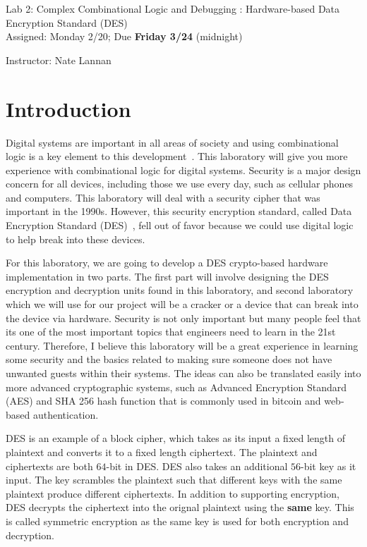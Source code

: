 \documentclass{article}
\newcommand{\myassignment}{Lab 2: Complex Combinational Logic and Debugging : Hardware-based Data Encryption Standard (DES)}
\newcommand{\myduedate}{Assigned: Monday 2/20; Due \textbf{Friday 3/24} (midnight)}
\newcommand{\myinstructor}{Instructor: Nate Lannan}
\begin{document}
\begin{center}
  {\huge \myassignment} \\
  {\large \myduedate} \\
  \begin{flushright}
  \myinstructor \\
  \end{flushright}
\end{center}

\section{Introduction}

Digital systems are important in all areas of society and using
combinational logic is a key element to this
development~\cite{ddca-riscv}.  This
laboratory will give you more experience with combinational logic
for digital systems.  
Security is a major design concern for all devices, including those  we
use every day, such as cellular phones and computers.
This laboratory will deal with a security cipher that was important in
the 1990s.  However, this security encryption standard, called Data
Encryption Standard (DES)~\cite{fips463, Biryukov2005}, fell out of
favor because we
could use
digital logic to help break into these devices.

For this laboratory, we are going to develop a DES crypto-based
hardware implementation
in two parts.  The first part will involve designing the
DES encryption and decryption units found in this laboratory,
and second laboratory which we will
use for our project will be a cracker or a
device that can break into the device via hardware.
Security is not only important but many people feel that its one of the most important
topics that engineers
need to learn in the 21st century.  Therefore, I
believe this laboratory will be a great experience in learning some
security and the basics related to making sure someone does not have
unwanted guests within their systems.  The ideas can also be
translated easily into more advanced cryptographic systems, such as
Advanced Encryption Standard (AES) and SHA 256 hash function that is
commonly used in bitcoin and web-based authentication.

DES is an example of a block cipher, which takes as its input a fixed
length of plaintext and converts it to a fixed length ciphertext.
The plaintext and ciphertexts are both $64$-bit in DES.  DES also
takes an additional $56$-bit key as it input.  The key scrambles the
plaintext such that different keys with the same plaintext produce
different ciphertexts.  In addition to supporting encryption,
DES decrypts the ciphertext into the orignal plaintext using the \textbf{same}
key.  This is called symmetric encryption as the same key is used
for both encryption and decryption.
\end{document}
